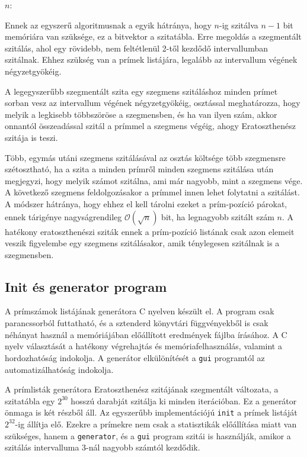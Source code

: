 \begin{algorithmic}[1]
\State $n$: 
\State {}
			\State {}
		\EndFor
	\EndIf
\EndFor
\end{algorithmic}

Ennek az egyszerű algoritmusnak a egyik hátránya, hogy $n$-ig szitálva $n-1$ bit memóriára van szüksége, ez a bitvektor a szitatábla.
Erre megoldás a szegmentált szitálás, ahol egy rövidebb, nem feltétlenül 2-től kezdődő intervallumban szitálnak.
Ehhez szükség van a prímek listájára, legalább az intervallum végének négyzetgyökéig.

A legegyszerűbb szegmentált szita egy szegmens szitáláshoz minden prímet sorban vesz az intervallum végének négyzetgyökéig, osztással meghatározza, hogy melyik a legkisebb többszöröse a szegmensben, és ha van ilyen szám, akkor onnantól összeadással szitál a prímmel a szegmens végéig, ahogy Eratoszthenész szitája is teszi.

Több, egymás utáni szegmens szitálásával az osztás költsége több szegmensre szétosztható, ha a szita a minden prímről minden szegmens szitálása után megjegyzi, hogy melyik számot szitálna, ami már nagyobb, mint a szegmens vége.
A következő szegmens feldolgozásakor a prímmel innen lehet folytatni a szitálást.
A módszer hátránya, hogy ehhez el kell tárolni ezeket a prím-pozíció párokat, ennek tárigénye nagyságrendileg $\mathcal{O}(\sqrt{n})$ bit, ha legnagyobb szitált szám $n$.
A hatékony eratoszthenészi sziták ennek a prím-pozíció listának csak azon elemeit veszik figyelembe egy szegmens szitálásakor, amik ténylegesen szitálnak is a szegmensben.

\subsection{Init és generator program}

A prímszámok listájának generátora C nyelven készült el.
A program csak parancssorból futtatható, és a sztenderd könyvtári függvényekből
is csak néhányat használ a memóriájában előállított eredmények fájlba írásához.
A C nyelv választását a hatékony végrehajtás és memóriafelhasználás, valamint a hordozhatóság indokolja. A generátor elkülönítését a \texttt{gui} programtól az automatizálhatóság indokolja.

A prímlisták generátora Eratoszthenész szitájának szegmentált változata,
a szitatábla egy $2^{30}$ hosszú darabját szitálja ki minden iterációban.
Ez a generátor önmaga is két részből áll.
Az egyszerűbb implementációjú \texttt{init} a prímek listáját $2^{32}$-ig állítja elő.
Ezekre a prímekre nem csak a statisztikák előállítása miatt van szükséges, hanem a \texttt{generator}, és a \texttt{gui} program szitái is használják, amikor a szitálás intervalluma 3-nál nagyobb számtól kezdődik.

